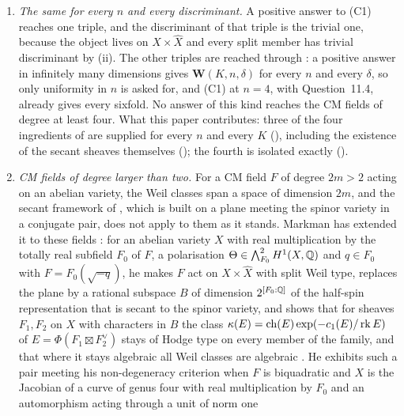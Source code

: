 \begin{enumerate}[label=\textup{(C\arabic*)},leftmargin=3.0em,itemsep=4pt]
  semi-homogeneous bundles (, ), which
  removes every candidate found by the search of , and
  no complete intersection occurs ().
\item \emph{The same for every $n$ and every discriminant.} A positive answer
  to (C1) reaches one triple, and the discriminant of that triple is the
  trivial one, because the object lives on $X\times\widehat X$ and every split
  member has trivial discriminant by (ii). The other
  triples are reached through : a positive answer in
  infinitely many dimensions gives $\mathbf{W}(K,n,\delta)$ for every $n$ and
  every $\delta$, so only uniformity in $n$ is asked for, and (C1) at $n=4$,
  with Question~11.4, already gives every sixfold. No answer of this kind
  reaches the CM fields of degree at least four. What this paper
  contributes: three of the four ingredients of  are supplied
  for every $n$ and every $K$ (), including the
  existence of the secant sheaves themselves (); the
  fourth is isolated exactly ().
\item \emph{CM fields of degree larger than two.} For a CM field $F$ of
  degree $2m>2$ acting on an abelian variety, the Weil classes span a space of
  dimension $2m$, and the secant framework of , which
  is built on a plane meeting the spinor variety in a conjugate pair, does not
  apply to them as it stands. Markman has extended it to these fields
  \cite{Mar25c}: for an abelian variety $X$ with real multiplication by the
  totally real subfield $F_{0}$ of $F$, a polarisation
  $\Theta\in\bigwedge^{2}_{F_{0}}H^{1}(X,\mathbb{Q})$ and $q\in F_{0}$ with
  $F=F_{0}(\sqrt{-q})$, he makes $F$ act on $X\times\widehat{X}$ with split
  Weil type, replaces the plane by a rational subspace $B$ of dimension
  $2^{[F_{0}:\mathbb{Q}]}$ of the half-spin representation that is secant to the
  spinor variety, and shows that for sheaves $F_{1},F_{2}$ on $X$ with
  characters in $B$ the class $\kappa(E)=\operatorname{ch}(E)\exp(-c_{1}(E)/\operatorname{rk} E)$ of
  $E=\Phi(F_{1}\boxtimes F_{2}^{\vee})$ stays of Hodge type on every member
  of the family, and that where it stays algebraic all Weil classes are
  algebraic \cite[Theorem~1.1.2, Proposition~10.2.1]{Mar25c}. He exhibits
  such a pair meeting his non-degeneracy criterion when $F$ is biquadratic
  and $X$ is the Jacobian of a curve of genus four with real multiplication
  by $F_{0}$ and an automorphism acting through a unit of norm one

\end{enumerate}
